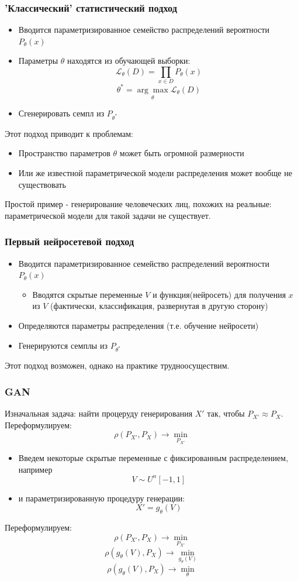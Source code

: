 \documentclass[9pt]{beamer}
\begin{document}
\begin{frame}\frametitle{'Классический' статистический подход}
	\begin{itemize}
		\item Вводится параметризированное семейство распределений вероятности $P_{\theta}(x)$
		\item Параметры $\theta$ находятся из обучающей выборки:
		$$ \mathcal{L}_{\theta}(D) = \prod_{x \in D} P_{\theta}(x) $$
		$$ \theta^{*} = \underset{\theta}{\arg\max} \mathcal{L}_{\theta}(D)$$
		\item Сгенерировать семпл из $ P_{\theta^{*}}$
	\end{itemize}
	Этот подход приводит к проблемам:
	\begin{itemize}
		\item Пространство параметров $\theta$ может быть огромной размерности
		\item Или же известной параметрической модели распределения может вообще не существовать
	\end{itemize}
	Простой пример - генерирование человеческих лиц, похожих на реальные: параметрической модели для такой задачи не существует.
\end{frame}

\begin{frame}\frametitle{Первый нейросетевой подход}
	\begin{itemize}
		\item Вводится параметризированное семейство распределений вероятности $P_{\theta}(x)$
		\begin{itemize}
			\item Вводятся скрытые переменные $V$ и функция(нейросеть) для получения $x$ из $V$ (фактически, классификация, развернутая в другую сторону)
		\end{itemize}
		\item Определяются параметры распределения (т.е. обучение нейросети)
		\item Генерируются семплы из $ P_{\theta^{*}}$
	\end{itemize}
	Этот подход возможен, однако на практике трудноосуществим.
\end{frame}

\begin{frame}\frametitle{GAN}
	Изначальная задача: найти процеруду генерирования $X'$ так, чтобы $ P_{X'} \approx P_X$.
	Переформулируем:
	$$ \rho(P_{X'}, P_X) \longrightarrow \underset{P_{X'}}{\min} $$
	\begin{itemize}
		\item Введем некоторые скрытые переменные с фиксированным распределением, например
		$$ V \sim U^n [-1, 1] $$
		\item и параметризированную процедуру генерации:
		$$ X' = g_{\theta}(V) $$
	\end{itemize}
	Переформулируем:
	$$ \rho(P_{X'}, P_X) \longrightarrow \underset{P_{X'}}{\min} $$
	$$ \rho(g_{\theta}(V), P_X) \longrightarrow \underset{g_{\theta}(V)}{\min} $$
	$$ \rho(g_{\theta}(V), P_X) \longrightarrow \underset{\theta}{\min} $$
\end{frame}
\end{document}
